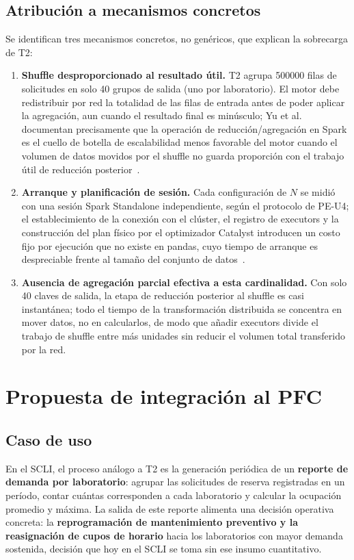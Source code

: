 \documentclass[10pt,journal]{IEEEtran}
\begin{document}
\subsection{Atribuci\'on a mecanismos concretos}
Se identifican tres mecanismos concretos, no gen\'ericos, que explican la
sobrecarga de T2:
\begin{enumerate}
\item \textbf{Shuffle desproporcionado al resultado \'util.} T2 agrupa
\num{500000} filas de solicitudes en solo 40 grupos de salida (uno por
laboratorio). El motor debe redistribuir por red la totalidad de las filas de
entrada antes de poder aplicar la agregaci\'on, aun cuando el resultado final
es min\'usculo; Yu et al. documentan precisamente que la operaci\'on de
reducci\'on/agregaci\'on en Spark es el cuello de botella de escalabilidad
menos favorable del motor cuando el volumen de datos movidos por el shuffle
no guarda proporci\'on con el trabajo \'util de reducci\'on
posterior~\cite{sparker2021}.
\item \textbf{Arranque y planificaci\'on de sesi\'on.} Cada configuraci\'on de
$N$ se midi\'o con una sesi\'on Spark Standalone independiente, seg\'un el
protocolo de PE-U4; el establecimiento de la conexi\'on con el cl\'uster, el
registro de executors y la construcci\'on del plan f\'isico por el
optimizador Catalyst introducen un costo fijo por ejecuci\'on que no existe en
pandas, cuyo tiempo de arranque es despreciable frente al tama\~no del
conjunto de datos~\cite{zaharia2016}.
\item \textbf{Ausencia de agregaci\'on parcial efectiva a esta cardinalidad.}
Con solo 40 claves de salida, la etapa de reducci\'on posterior al shuffle es
casi instant\'anea; todo el tiempo de la transformaci\'on distribuida se
concentra en mover datos, no en calcularlos, de modo que a\~nadir executors
divide el trabajo de shuffle entre m\'as unidades sin reducir el volumen
total transferido por la red.
\end{enumerate}

\section{Propuesta de integraci\'on al PFC}
\label{sec:propuesta}

\subsection{Caso de uso}
En el SCLI, el proceso an\'alogo a T2 es la generaci\'on peri\'odica de un
\textbf{reporte de demanda por laboratorio}: agrupar las solicitudes de
reserva registradas en un per\'iodo, contar cu\'antas corresponden a cada
laboratorio y calcular la ocupaci\'on promedio y m\'axima. La salida de este
reporte alimenta una decisi\'on operativa concreta: la
\textbf{reprogramaci\'on de mantenimiento preventivo y la reasignaci\'on de
cupos de horario} hacia los laboratorios con mayor demanda sostenida,
decisi\'on que hoy en el SCLI se toma sin ese insumo cuantitativo.
\end{document}
